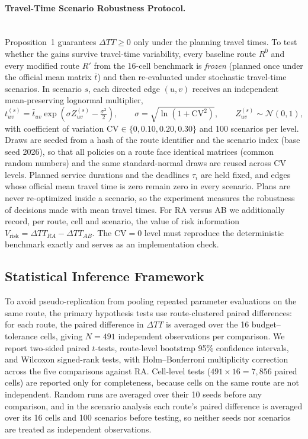 \documentclass[11pt,a4paper]{article}
\begin{document}
\paragraph{Travel-Time Scenario Robustness Protocol.}\mbox{}\\
Proposition~1 guarantees $\Delta TT \ge 0$ only under the planning travel times. To test whether the gains survive travel-time variability, every baseline route $R^0$ and every modified route $R'$ from the 16-cell benchmark is \emph{frozen} (planned once under the official mean matrix $\bar{t}$) and then re-evaluated under stochastic travel-time scenarios. In scenario $s$, each directed edge $(u,v)$ receives an independent mean-preserving lognormal multiplier,
\begin{equation}
t^{(s)}_{uv} = \bar{t}_{uv} \exp\!\left(\sigma Z^{(s)}_{uv} - \tfrac{\sigma^2}{2}\right), \qquad \sigma = \sqrt{\ln(1 + \mathrm{CV}^2)}, \qquad Z^{(s)}_{uv} \sim \mathcal{N}(0,1),
\end{equation}
with coefficient of variation $\mathrm{CV} \in \{0, 0.10, 0.20, 0.30\}$ and 100 scenarios per level. Draws are seeded from a hash of the route identifier and the scenario index (base seed 2026), so that all policies on a route face identical matrices (common random numbers) and the same standard-normal draws are reused across CV levels. Planned service durations and the deadlines $\tau_i$ are held fixed, and edges whose official mean travel time is zero remain zero in every scenario. Plans are never re-optimized inside a scenario, so the experiment measures the robustness of decisions made with mean travel times. For RA versus AB we additionally record, per route, cell and scenario, the value of risk information $V_{\text{risk}} = \Delta TT_{RA} - \Delta TT_{AB}$. The $\mathrm{CV}=0$ level must reproduce the deterministic benchmark exactly and serves as an implementation check.

\subsection{Statistical Inference Framework}\label{sec:statistical-framework}
To avoid pseudo-replication from pooling repeated parameter evaluations on the same route, the primary hypothesis tests use route-clustered paired differences: for each route, the paired difference in $\Delta TT$ is averaged over the 16 budget--tolerance cells, giving $N = 491$ independent observations per comparison. We report two-sided paired $t$-tests, route-level bootstrap 95\% confidence intervals, and Wilcoxon signed-rank tests, with Holm--Bonferroni multiplicity correction \cite{holm1979} across the five comparisons against RA. Cell-level tests ($491 \times 16 = 7{,}856$ paired cells) are reported only for completeness, because cells on the same route are not independent. Random runs are averaged over their 10 seeds before any comparison, and in the scenario analysis each route's paired difference is averaged over its 16 cells and 100 scenarios before testing, so neither seeds nor scenarios are treated as independent observations.
\end{document}
